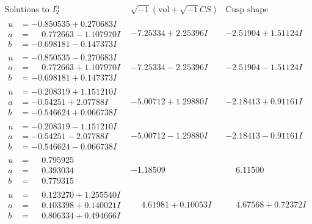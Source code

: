 \documentclass[1p]{elsarticle_modified}
\theoremstyle{definition}
\newcommand{\I}{\sqrt{-1}}
\begin{document}
$$\begin{array}{c|c|c}  
\text{Solutions to }I^u_{2}& \I (\text{vol} + \sqrt{-1}CS) & \text{Cusp shape}\\
 \hline 
\begin{aligned}
u &= -0.850535 + 0.270683 I \\
a &= \phantom{-}0.772663 - 1.107970 I \\
b &= -0.698181 - 0.147373 I\end{aligned}
 & -7.25334 + 2.25396 I & -2.51904 + 1.51124 I \\ \hline\begin{aligned}
u &= -0.850535 - 0.270683 I \\
a &= \phantom{-}0.772663 + 1.107970 I \\
b &= -0.698181 + 0.147373 I\end{aligned}
 & -7.25334 - 2.25396 I & -2.51904 - 1.51124 I \\ \hline\begin{aligned}
u &= -0.208319 + 1.151210 I \\
a &= -0.54251 + 2.07788 I \\
b &= -0.546624 + 0.066738 I\end{aligned}
 & -5.00712 + 1.29880 I & -2.18413 + 0.91161 I \\ \hline\begin{aligned}
u &= -0.208319 - 1.151210 I \\
a &= -0.54251 - 2.07788 I \\
b &= -0.546624 - 0.066738 I\end{aligned}
 & -5.00712 - 1.29880 I & -2.18413 - 0.91161 I \\ \hline\begin{aligned}
u &= \phantom{-}0.795925\phantom{ +0.000000I} \\
a &= \phantom{-}0.393034\phantom{ +0.000000I} \\
b &= \phantom{-}0.779315\phantom{ +0.000000I}\end{aligned}
 & -1.18509\phantom{ +0.000000I} & \phantom{-}6.11500\phantom{ +0.000000I} \\ \hline\begin{aligned}
u &= \phantom{-}0.123270 + 1.255540 I \\
a &= \phantom{-}0.103398 + 0.140021 I \\
b &= \phantom{-}0.806334 + 0.494666 I\end{aligned}
 & \phantom{-}4.61981 + 0.10053 I & \phantom{-}4.67568 + 0.72372 I \\ \hline\begin{aligned}

\end{aligned}
\end{array}$$
\end{document}
